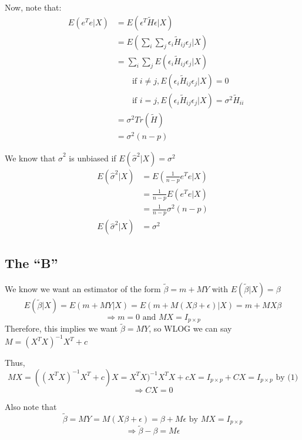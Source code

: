 \documentclass[12pt]{article}
\begin{document}
Now, note that:
\doublespacing
\[ \begin{array}{rrl} 
&  E(e^{T}e |X) &= E(\epsilon^{T} \tilde{H} \epsilon | X) \\
& &= E(\sum_{i}\sum_{j} \epsilon_{i} \tilde{H}_{ij} \epsilon_{j} | X) \\ %
& &= \sum_{i} \sum_{j} E(\epsilon_{i} \tilde{H}_{ij} \epsilon_{j} |X ) \\
& & \qquad \text{if } i \ne j, E(\epsilon_{i} \tilde{H}_{ij} \epsilon_{j} |X ) = 0\\
& & \qquad \text{if } i = j, E(\epsilon_{i} \tilde{H}_{ij} \epsilon_{j} |X ) = \sigma^2\tilde{H}_{ii} \\
& &= \sigma^2 Tr(\tilde{H}) \\ %
& &= \sigma^2 (n - p)
\end{array} \]
\singlespacing

We know that $\hat{\sigma}^2$ is unbiased if $E (\hat{\sigma}^2 |X) = \sigma^2$
\doublespacing
\[ \begin{array}{rl} 
E(\hat{\sigma}^2 | X) &= E(\frac{1}{n-p}e^{T}e | X) \\
 &= \frac{1}{n-p}E(e^{T}e | X) \\
 &= \frac{1}{n-p} \sigma^2 (n - p) \\
 E(\hat{\sigma}^2 | X) &= \sigma^2
\end{array} \]
\singlespacing

\subsection{The ``B''}
We know we want an estimator of the form $\tilde{\beta} = m + MY$ with $E(\tilde{\beta} | X) = \beta$
\[ E(\tilde{\beta} | X) = E(m + MY | X) = E(m + M(X\beta + \epsilon) | X) = m + MX\beta \]
\begin{equation} \Rightarrow m = 0 \text{ and }MX = I_{p \times p} \end{equation}
Therefore, this implies we want $\tilde{\beta} = MY$, so WLOG we can say $M = (X^{T}X)^{-1}X^{T} + c$

Thus,
\[ MX = ((X^{T}X)^{-1}X^{T} + c)X = X^{T}X)^{-1}X^{T}X + cX = I_{p \times p} + CX  = I_{p \times p} \text{ by (1)} \]
\begin{equation} \Rightarrow CX = 0 \end{equation}

Also note that
\[ \tilde{\beta} = MY = M(X\beta + \epsilon) = \beta + M\epsilon \text{ by } MX = I_{p \times p} \]
\begin{equation} \Rightarrow \tilde{\beta} - \beta = M\epsilon \end{equation}
\end{document}

